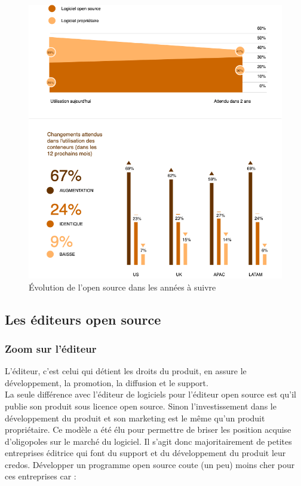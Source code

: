 					\begin{figure}[h]
						\center
						\includegraphics[scale=0.65]{./img/Enterprise_os.png}
						\caption{Évolution de l'open source dans les années à suivre}					
					\end{figure}
					\clearpage
					

		\subsection{Les éditeurs open source}

			\subsubsection{Zoom sur l'éditeur}

				L'éditeur, c'est celui qui détient les droits du produit, en assure le développement, la promotion, la diffusion et le support.\\
			
				La seule différence avec l'éditeur de logiciels pour l'éditeur open source est qu'il publie son produit sous licence open source. Sinon l'investissement dans le développement du produit et son marketing est le même qu'un produit propriétaire.
				Ce modèle a été élu pour permettre de briser les position acquise d'oligopoles sur le marché du logiciel.
				Il s'agit donc majoritairement de petites entreprises éditrice qui font du support et du développement du produit leur credos.
				Développer un programme open source coute (un peu) moins cher pour ces entreprises car :

